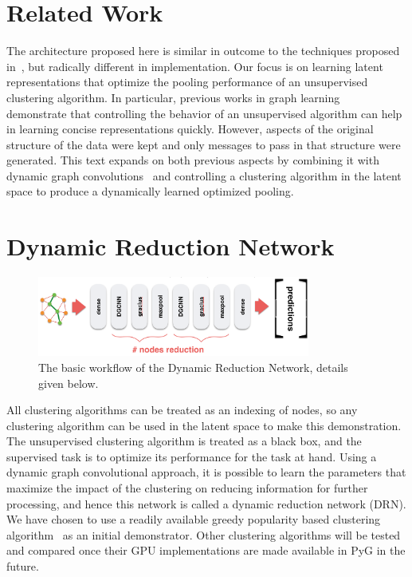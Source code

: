 \documentclass{article}
\begin{document}
\section{Related Work}

The architecture proposed here is similar in outcome to the techniques proposed in~\cite{diehl2019edge, lee2019selfattention}, but radically different in implementation.
Our focus is on learning latent representations that optimize the pooling performance of an unsupervised clustering algorithm.
In particular, previous works in graph learning~\cite{monti2016geometric,fey2017splinecnn} demonstrate that controlling the behavior of an unsupervised algorithm can help in learning concise representations quickly. 
However, aspects of the original structure of the data were kept and only messages to pass in that structure were generated.
This text expands on both previous aspects by combining it with dynamic graph convolutions~\cite{wang2018dynamic} and controlling a clustering algorithm in the latent space to produce a dynamically learned optimized pooling.

\section{Dynamic Reduction Network}

\begin{figure}[!hbt]
    \centering
    \includegraphics[width=0.8\textwidth]{drn_flow.png}
    \caption{The basic workflow of the Dynamic Reduction Network, details given below.}
    \label{fig:drn_flow}
\end{figure}

All clustering algorithms can be treated as an indexing of nodes, so any clustering algorithm can be used in the latent space to make this demonstration.
The unsupervised clustering algorithm is treated as a black box, and the supervised task is to optimize its performance for the task at hand.
Using a dynamic graph convolutional approach,  it is possible to learn the parameters that maximize the impact of the clustering on reducing information for further processing, and hence this network is called a dynamic reduction network (DRN).
We have chosen to use a readily available greedy popularity based clustering algorithm~\cite{10.5555/2340646.2340660} as an initial demonstrator.
Other clustering algorithms will be tested and compared once their GPU implementations are made available in PyG in the future.
\end{document}
